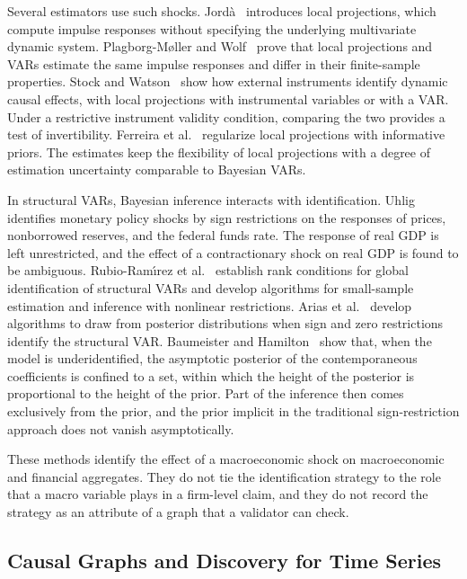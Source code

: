   Several estimators use such shocks. Jord{\`a}~\cite{jorda2005local} introduces local
  projections, which compute impulse responses without specifying the
  underlying multivariate dynamic system. Plagborg-M{\o}ller and Wolf~\cite{plagborg2021local} prove that
  local projections and VARs estimate the same impulse responses and differ in
  their finite-sample properties. Stock and Watson~\cite{stock2018identification} show how
  external instruments identify dynamic causal effects, with local projections
  with instrumental variables or with a VAR. Under a restrictive instrument
  validity condition, comparing the two provides a test of invertibility.
  Ferreira et al.~\cite{ferreira2025bayesian} regularize local projections with informative
  priors. The estimates keep the flexibility of local projections with a degree
  of estimation uncertainty comparable to Bayesian VARs.

  In structural VARs, Bayesian inference interacts with identification.
  Uhlig~\cite{uhlig2005what} identifies monetary policy shocks by sign restrictions on
  the responses of prices, nonborrowed reserves, and the federal funds rate. The
  response of real GDP is left unrestricted, and the effect of a contractionary
  shock on real GDP is found to be ambiguous. Rubio-Ram{\'\i}rez et al.~\cite{rubio2010structural}
  establish rank conditions for global identification of structural VARs and
  develop algorithms for small-sample estimation and inference with nonlinear
  restrictions. Arias et al.~\cite{arias2018inference} develop algorithms to draw from
  posterior distributions when sign and zero restrictions identify the
  structural VAR. Baumeister and Hamilton~\cite{baumeister2015sign} show that, when the model is
  underidentified, the asymptotic posterior of the contemporaneous coefficients
  is confined to a set, within which the height of the posterior is
  proportional to the height of the prior. Part of the inference then comes
  exclusively from the prior, and the prior implicit in the traditional
  sign-restriction approach does not vanish asymptotically.

  These methods identify the effect of a macroeconomic shock on macroeconomic
  and financial aggregates. They do not tie the identification strategy to the
  role that a macro variable plays in a firm-level claim, and they do not
  record the strategy as an attribute of a graph that a validator can check.

  \subsection{Causal Graphs and Discovery for Time Series}\label{sec:sota_discovery}

